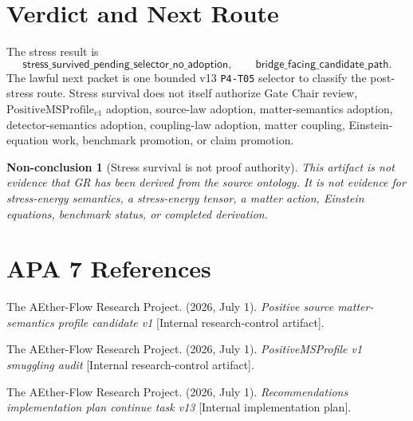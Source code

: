 \documentclass[11pt]{article}
\newcommand{\PMSProf}{\mathrm{PositiveMSProfile}_{v1}}
\newcommand{\StressVerdict}{\mathsf{stress\_survived\_pending\_selector\_no\_adoption}}
\newtheorem{nonconclusion}{Non-conclusion}
\begin{document}
\section{Verdict and Next Route}

The stress result is
\[
  \StressVerdict,
  \qquad
  \mathsf{bridge\_facing\_candidate\_path}.
\]
The lawful next packet is one bounded v13 \texttt{P4-T05} selector to classify
the post-stress route. Stress survival does not itself authorize Gate Chair
review, \(\PMSProf\) adoption, source-law adoption, matter-semantics adoption,
detector-semantics adoption, coupling-law adoption, matter coupling,
Einstein-equation work, benchmark promotion, or claim promotion.

\begin{nonconclusion}[Stress survival is not proof authority]
This artifact is not evidence that GR has been derived from the source
ontology. It is not evidence for stress-energy semantics, a stress-energy
tensor, a matter action, Einstein equations, benchmark status, or completed
derivation.
\end{nonconclusion}

\section{APA 7 References}

The AEther-Flow Research Project. (2026, July 1).
\emph{Positive source matter-semantics profile candidate v1}
[Internal research-control artifact].

The AEther-Flow Research Project. (2026, July 1).
\emph{PositiveMSProfile v1 smuggling audit}
[Internal research-control artifact].

The AEther-Flow Research Project. (2026, July 1).
\emph{Recommendations implementation plan continue task v13}
[Internal implementation plan].
\end{document}
